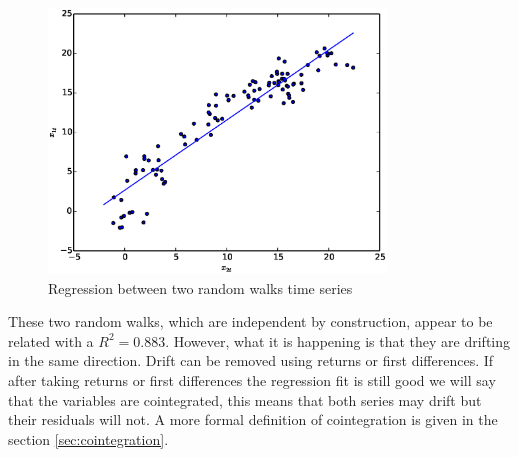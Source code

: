 \begin{figure}[!h]
  \centering
  \includegraphics[width=0.8\textwidth]{img/spurious2}
  \caption{Regression between two random walks time series}
  \label{fig:spurious2}
\end{figure}

These two random walks, which are independent by construction, appear to be related with a $R^2=0.883$. However, what it is happening is that they are drifting in the same direction. Drift can be removed using returns or first differences.
If after taking returns or first differences the regression fit is still good we will say that the variables are cointegrated, this means that both series may drift but their residuals will not. A more formal definition of cointegration is given in the section \ref{sec:cointegration}.


